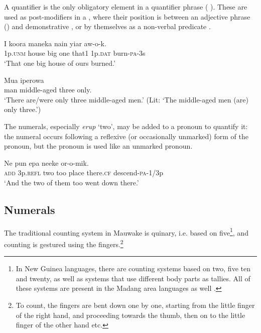 A quantifier is the only obligatory element in a quantifier phrase ( ). These are used as post-modifiers in a , where their position is between an adjective phrase () and demonstrative , or by themselves as a non-verbal predicate . 

\ea%
\label{ex:3:x87}
\gll I koora maneka  nain yiar aw-o-k. \\
1p.\textsc{unm} house big one that1 1p.\textsc{dat} burn-\textsc{pa}-3s\\
\glt`That one big house of ours burned.'
\z

\ea%
\label{ex:3:x442}
\gll Mua iperowa   \\
man middle-aged three only.\\
\glt`There are/were only three middle-aged men.' (Lit: `The middle-aged men (are) only three.') 
\z

The numerals, especially \textit{erup} `two', may be added to a pronoun to quantify it: the numeral occurs following a reflexive (or occasionally unmarked) form of the pronoun, but the pronoun is used like an unmarked pronoun.

\ea%
\label{ex:3:x89}
\gll Ne   pun epa neeke or-o-mik. \\
\textsc{add} 3p.\textsc{refl} two too place there.\textsc{cf} descend-\textsc{pa}-1/3p\\
\glt`And the two of them too went down there.'
\z

\subsection{Numerals}\label{sec:3.4.1}
{}
The traditional counting system in Mauwake is quinary, i.e. based on five\footnote{In New Guinea languages, there are counting systems based on two, five ten and twenty, as well as systems that use different body parts as tallies. All of these systems are present in the Madang area languages as well \citep{Lean1991}.}, and counting is gestured using the fingers.\footnote{To count, the fingers are bent down one by one, starting from the little finger of the right hand, and proceeding towards the thumb, then on to the little finger of the other hand etc.} 

